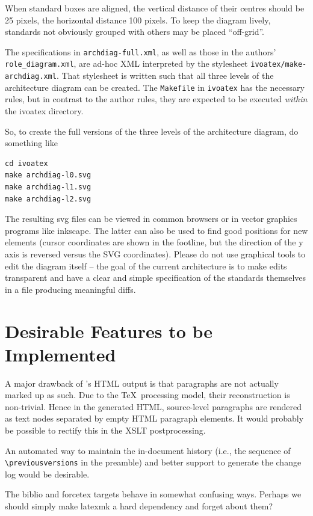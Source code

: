 \documentclass[11pt,a4paper]{ivoa}
\begin{document}
When standard boxes are aligned, the
vertical distance of their centres should be 25 pixels, the horizontal
distance 100 pixels.  To keep the diagram lively, standards not
obviously grouped with others may be placed ``off-grid''.

The specifications in \verb|archdiag-full.xml|, as well as those in
the authors' \verb|role_diagram.xml|, are ad-hoc XML interpreted by the
stylesheet \verb|ivoatex/make-archdiag.xml|.  That stylesheet is
written such that all three levels of the architecture diagram can be
created.  The \verb|Makefile| in \verb|ivoatex| has the necessary
rules, but in contrast to the author rules, they are expected to be
executed \emph{within} the ivoatex directory.

So, to create the full versions of the three levels of the architecture
diagram, do something like

\begin{lstlisting}
cd ivoatex
make archdiag-l0.svg
make archdiag-l1.svg
make archdiag-l2.svg
\end{lstlisting}

The resulting svg files can be viewed in common browsers or in vector
graphics programs like inkscape.  The latter can also be used to find
good positions for new elements (cursor coordinates are shown in the
footline, but the direction of the y axis is reversed versus the SVG
coordinates).  Please do not use graphical tools to edit the diagram
itself -- the goal of the current architecture is to make edits
transparent and have a clear and simple specification of the standards
themselves in a file producing meaningful diffs.

\section{Desirable Features to be Implemented}

A major drawback of \ivoatex's HTML output is that paragraphs are not actually
marked up as such.  Due to the \TeX\ processing model, their
reconstruction is non-trivial.  Hence in the generated HTML,
source-level paragraphs are rendered as text nodes separated by empty
HTML paragraph elements.  It would probably be possible to rectify this
in the XSLT postprocessing.

An automated way to maintain the in-document history (i.e., the sequence
of \verb|\previousversions| in the preamble) and better support to
generate the change log would be desirable.

The biblio and forcetex targets behave in somewhat confusing ways.
Perhaps we should simply make latexmk a hard dependency and forget about
them?
\end{document}
